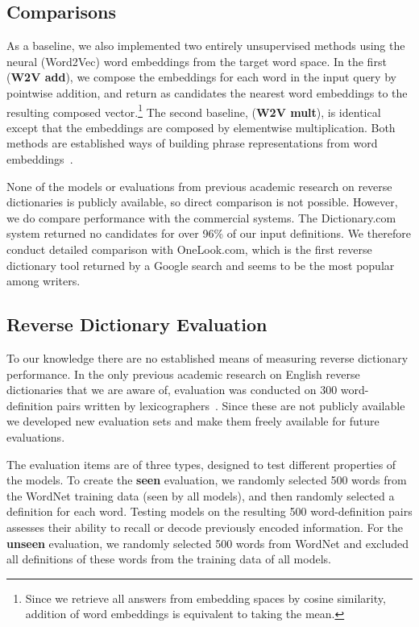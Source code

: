 \documentclass[11pt,letterpaper]{article}
\begin{document}
\subsection{Comparisons}

As a baseline, we also implemented two entirely unsupervised methods using the neural (Word2Vec) word embeddings from the target word space. In the first ({\bf W2V add}), we compose the embeddings for each word in the input query by pointwise addition, and return as candidates the nearest word embeddings to the resulting composed vector.\footnote{Since we retrieve all answers from embedding spaces by cosine similarity, addition of word embeddings is equivalent to taking the mean.} The second baseline, ({\bf W2V mult}), is identical except that the embeddings are composed by elementwise multiplication. Both methods are established ways of building phrase representations from word embeddings~\cite{mitchell2010composition}.

None of the models or evaluations from previous academic research on reverse dictionaries is publicly available, so direct comparison is not possible. However, we do compare performance with the commercial systems. The Dictionary.com system returned no candidates for over 96\% of our input definitions. We therefore conduct detailed comparison with OneLook.com, which is the first reverse dictionary tool returned by a Google search and seems to be the most popular among writers. 

\subsection{Reverse Dictionary Evaluation}

To our knowledge there are no established means of measuring reverse dictionary performance. In the only previous academic research on English reverse dictionaries that we are aware of, evaluation was conducted on 300 word-definition pairs written by lexicographers~\cite{shaw2013building}. Since these are not publicly available we developed new evaluation sets and make them freely available for future evaluations.  

The evaluation items are of three types, designed to test different properties of the models. To create the {\bf seen} evaluation, we randomly selected 500 words from the WordNet training data (seen by all models), and then randomly selected a definition for each word. Testing models on the resulting 500 word-definition pairs assesses their ability to recall or decode previously encoded information. For the {\bf unseen} evaluation, we randomly selected 500 words from WordNet and excluded all definitions of these words from the training data of all models. 
\end{document}
